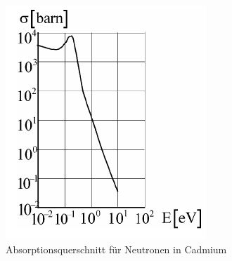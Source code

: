 \begin{figure}[tb]
  \centering
  \includegraphics[scale=1.0]{./fig/cd_wirkungsquerschnitt.png}
  \caption{Absorptionsquerschnitt für Neutronen in Cadmium \cite{BB}}
  \label{fig:cd}
\end{figure}